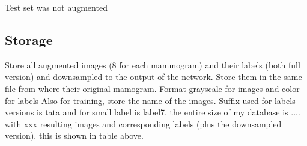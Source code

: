 Test set was not augmented


\subsection{Storage} 
Store all augmented images (8 for each mammogram) and their labels (both full version) and downsampled to the output of the network. Store them in the same file from where their original mamogram. 
Format grayscale for images and color for labels
Also for training, store the name of the images. Suffix used for labels versions is tata and for small label is label7.
the entire size of my database is .... with xxx resulting images and corresponding labels (plus the downsampled version). this is shown in table above.
